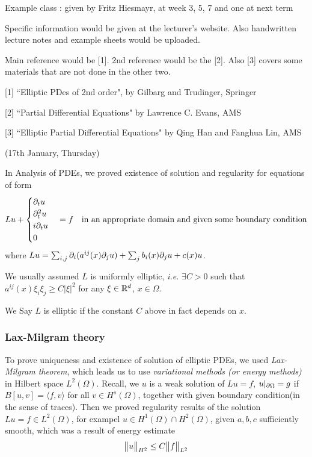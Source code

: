 \documentclass[12pt,a4paper]{article}
\begin{document}
Example class : given by Fritz Hiesmayr, at week 3, 5, 7 and one at next term

Specific information would be given at the lecturer's website. Also handwritten lecture notes and example sheets would be uploaded.

Main reference would be [1]. 2nd reference would be the [2]. Also [3] covers some materials that are not done in the other two.
\s

[1] ``Elliptic PDes of 2nd order", by Gilbarg and Trudinger, Springer

[2] ``Partial Differential Equations" by Lawrence C. Evans, AMS

[3] ``Elliptic Partial Differential Equations" by Qing Han and Fanghua Lin, AMS
\s

\newday

(17th January, Thursday)
\s

In Analysis of PDEs, we proved existence of solution and regularity for equations of form
\begin{align*}
Lu + \begin{cases}
\partial_t u \\
\partial_t^2  u\\
i\partial_t u\\
0
\end{cases} = f \quad \text{in an appropriate domain and given some boundary condition} 
\end{align*}
where $Lu = \sum_{i,j} \partial_i (a^{ij}(x) \partial_j u) + \sum_j b_i(x)\partial_j u + c(x)u$.

\quad We usually assumed $L$ is uniformly elliptic, \textit{i.e.} $\exists C>0$ such that $a^{ij}(x)\xi_i \xi_j \geq C|\xi|^2$ for any $\xi \in \mathbb{R}^d$, $x\in \Omega$.

\quad We Say $L$ is elliptic if the constant $C$ above in fact depends on $x$. 
\s

\subsubsection*{Lax-Milgram theory}

To prove uniqueness and existence of solution of elliptic PDEs, we used \emph{Lax-Milgram theorem}, which leads us to use \emph{variational methods (or energy methods)} in Hilbert space $L^2(\Omega)$. Recall, we $u$ is a weak solution of $Lu =f$, $u|_{\partial \Omega}=g$ if $B[u,v]= \langle f,v\rangle$ for all $v\in H^s(\Omega)$, together with given boundary condition(in the sense of traces). Then we proved regularity results of the solution $Lu =f \in L^2(\Omega)$, for exampel $u\in H^1(\Omega) \cap H^2(\Omega)$, given $a,b,c$ sufficiently smooth, which was a result of energy estimate
\begin{align*}
\bigl\lVert u\bigr\rVert_{H^2}\leq C\bigl\lVert f\bigr\rVert_{L^2}
\end{align*}
\end{document}
